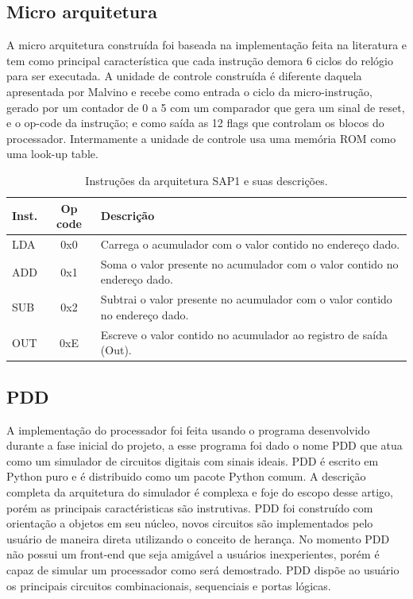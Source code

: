 \documentclass[11pt, twocolumn]{article}
\begin{document}
\subsection{Micro arquitetura}
A micro arquitetura construída foi baseada na implementação feita na literatura e tem como principal característica que cada instrução demora 6 ciclos do relógio para ser executada. A unidade de controle construída é diferente daquela apresentada por Malvino e recebe como entrada o ciclo da micro-instrução, gerado por um contador de 0 a 5 com um comparador que gera um sinal de reset, e o op-code da instrução; e como saída as 12 flags que controlam os blocos do processador. Intermamente a unidade de controle usa uma memória ROM como uma look-up table.

\begin{table}
  \caption{Instruções da arquitetura SAP1 e suas descrições.}
\begin{tabular*}{\linewidth}{lcp{5cm}}
  \hline
 Inst. & Op code & Descrição \\
 \hline
 LDA         &     0x0 & Carrega o acumulador com o valor contido no endereço dado. \\
 ADD         &     0x1 & Soma o valor presente no acumulador com o valor contido no endereço dado. \\
 SUB         &     0x2 & Subtrai o valor presente no acumulador com o valor contido no endereço dado.\\
 OUT         &     0xE & Escreve o valor contido no acumulador ao registro de saída (Out). \\ 
 \hline
\end{tabular*}
\label{tab-inst}
\end{table}


\subsection{PDD}
A implementação do processador foi feita usando o programa desenvolvido durante a fase inicial do projeto, a esse programa foi dado o nome PDD que atua como um simulador de circuitos digitais com sinais ideais.
PDD é escrito em Python puro e é distribuido como um pacote Python comum.
A descrição completa da arquitetura do simulador é complexa e foje do escopo desse artigo, porém as principais caractéristicas são instrutivas.
PDD foi construído com orientação a objetos em seu núcleo, novos circuitos são implementados pelo usuário de maneira direta utilizando o conceito de herança.
No momento PDD não possui um front-end que seja amigável a usuários inexperientes, porém é capaz de simular um processador como será demostrado.
PDD dispõe ao usuário os principais circuitos combinacionais, sequenciais e portas lógicas.
\end{document}
